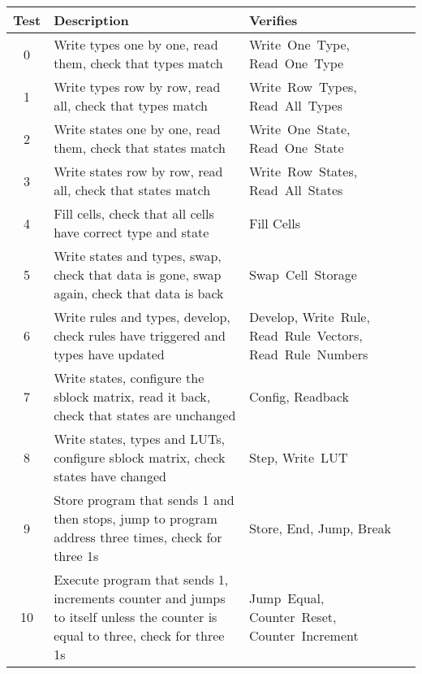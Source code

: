 \begin{table}[!ht]
    \renewcommand{\arraystretch}{1.4}
    \centering
    \begin{tabularx}{\textwidth}{c|>{\raggedright\arraybackslash}X|>{\raggedright\arraybackslash}p{}}
        \bfseries Test & \bfseries Description & \bfseries Verifies \\
        \hline
        0 & Write types one by one, read them, check that types match & Write~One~Type, Read~One~Type \\
        1 & Write types row by row, read all, check that types match & Write~Row~Types, Read~All~Types \\
        2 & Write states one by one, read them, check that states match & Write~One~State, Read~One~State \\
        3 & Write states row by row, read all, check that states match & Write~Row~States, Read~All~States \\
        4 & Fill cells, check that all cells have correct type and state & Fill Cells \\
        5 & Write states and types, swap, check that data is gone, swap again, check that data is back & Swap~Cell~Storage \\
        6 & Write rules and types, develop, check rules have triggered and types have updated & Develop, Write~Rule, Read~Rule~Vectors, Read~Rule~Numbers \\
        7 & Write states, configure the sblock matrix, read it back, check that states are unchanged & Config, Readback \\
        8 & Write states, types and LUTs, configure sblock matrix, check states have changed & Step, Write~LUT \\
        9 & Store program that sends 1 and then stops, jump to program address three times, check for three 1s & Store, End, Jump, Break \\
        10 & Execute program that sends 1, increments counter and jumps to itself unless the counter is equal to three, check for three 1s & Jump~Equal, Counter~Reset, Counter~Increment \\
    \end{tabularx}
\end{table}

